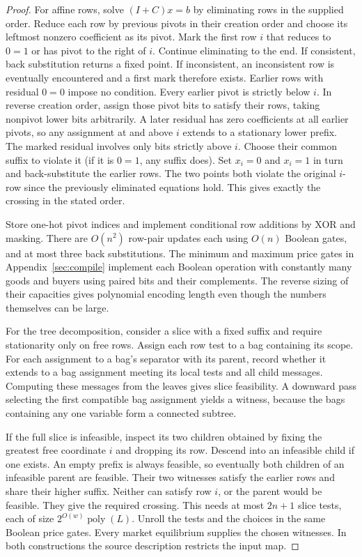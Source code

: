 \documentclass[11pt,oneside,openany,notitlepage]{report}
\begin{document}
\begin{proof}
For affine rows, solve \((I+C)x=b\) by eliminating rows in the supplied
order. Reduce each row by previous pivots in their creation order and
choose its leftmost nonzero coefficient as its pivot. Mark the first
row \(i\) that reduces to \(0=1\) or has pivot to the right of \(i\).
Continue eliminating to the end. If consistent, back substitution
returns a fixed point. If inconsistent, an inconsistent row is eventually encountered and a
first mark therefore exists. Earlier rows with residual \(0=0\) impose
no condition. Every earlier pivot is strictly below \(i\). In reverse
creation order, assign those pivot bits to satisfy their rows, taking
nonpivot lower bits arbitrarily. A later residual has zero coefficients
at all earlier pivots, so any assignment at and above \(i\) extends to a
stationary lower prefix. The marked residual involves only bits strictly
above \(i\). Choose their common suffix to violate it
(if it is \(0=1\), any suffix does). Set \(x_i=0\) and \(x_i=1\) in
turn and back-substitute the earlier rows. The two points both violate
the original \(i\)-row since the previously eliminated equations hold.
This gives exactly the crossing in the stated order.

Store one-hot pivot indices and implement conditional row additions
by XOR and masking. There are \(O(n^2)\) row-pair updates each using
\(O(n)\) Boolean gates, and at most three back substitutions. The
minimum and maximum price gates in Appendix~\ref{sec:compile} implement
each Boolean operation with constantly many goods and buyers using
paired bits and their complements. The reverse sizing of their capacities
gives polynomial encoding length even though the numbers themselves can
be large.

For the tree decomposition, consider a slice with a fixed suffix and
require stationarity only on free rows. Assign each row test to a bag
containing its scope. For each assignment to a bag's separator with
its parent, record whether it extends to a bag assignment meeting its
local tests and all child messages. Computing these messages from the
leaves gives slice feasibility. A downward pass selecting the first
compatible bag assignment yields a witness, because the bags containing
any one variable form a connected subtree.

If the full slice is infeasible, inspect its two children obtained by
fixing the greatest free coordinate \(i\) and dropping its row.
Descend into an infeasible child if one exists. An empty prefix is
always feasible, so eventually both children of an infeasible parent
are feasible. Their two witnesses satisfy the earlier rows and share
their higher suffix. Neither can satisfy row \(i\), or the parent would
be feasible. They give the required crossing. This needs at most
\(2n+1\) slice tests, each of size \(2^{O(w)}\operatorname{poly}(L)\).
Unroll the tests and the choices in the same Boolean price gates.
Every market equilibrium supplies the chosen witnesses. In both
constructions the source description restricts the input map.
\end{proof}
\end{document}
